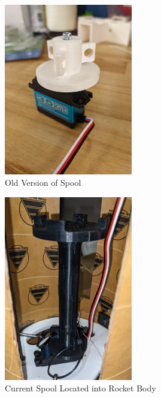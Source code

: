 \begin{figure}[H]
    \centering
    \includegraphics[width=0.5\textwidth]{src/figs/OldSpool.jpg}
    \caption{Old Version of Spool}
    \label{fig:OldSpool}
\end{figure}

\begin{figure}[H]
    \centering
    \includegraphics[width=0.5\textwidth]{src/figs/NewSpool.jpg}
    \caption{Current Spool Located into Rocket Body}
    \label{fig:curSpool}
\end{figure}

